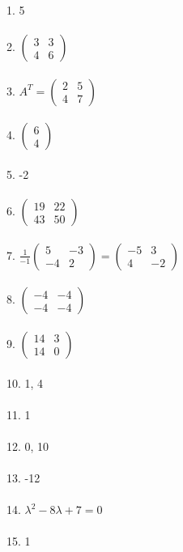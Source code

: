 \documentclass[fleqn]{article}
\begin{document}
1. 5 \\\\
2. \( \begin{pmatrix} 3 & 3 \\ 4 & 6 \end{pmatrix} \) \\\\
3. \( A^T = \begin{pmatrix} 2 & 5 \\ 4 & 7 \end{pmatrix} \) \\\\
4. \( \begin{pmatrix} 6 \\ 4 \end{pmatrix} \) \\\\
5. -2 \\\\
6. \( \begin{pmatrix} 19 & 22 \\ 43 & 50 \end{pmatrix} \) \\\\
7. \( \frac{1}{-1} \begin{pmatrix} 5 & -3 \\ -4 & 2 \end{pmatrix} = \begin{pmatrix} -5 & 3 \\ 4 & -2 \end{pmatrix} \) \\\\
8. \( \begin{pmatrix} -4 & -4 \\ -4 & -4 \end{pmatrix} \) \\\\
9. \( \begin{pmatrix} 14 & 3 \\ 14 & 0 \end{pmatrix} \) \\\\
10. 1, 4 \\\\
11. 1 \\\\
12. 0, 10 \\\\
13. -12 \\\\
14. \( \lambda^2 - 8\lambda + 7 = 0 \) \\\\
15. 1 \\\\      
        
\end{document}
